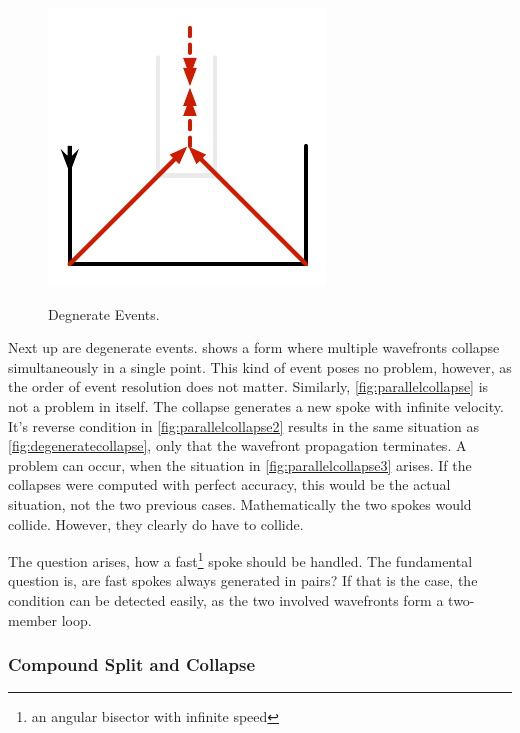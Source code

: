 \documentclass[12pt,a4paper,oneside,openany]{article}
\begin{document}
\begin{figure}[htpb]
\begin{center}
{		\includegraphics[scale=0.6667]{fig-parallel-collapse3.pdf}
		\label{fig:parallelcollapse3}}
\caption{Degnerate Events.}
\label{fig:degenerateevents}
\end{center}
\end{figure}


Next up are degenerate events.  shows a form where multiple wavefronts collapse simultaneously in a single point. This kind of event poses no problem, however, as the order of event resolution does not matter. Similarly, \cref{fig:parallelcollapse} is not a problem in itself. The collapse generates a new spoke with infinite velocity. It's reverse condition in  \cref{fig:parallelcollapse2} results in the same situation as \cref{fig:degeneratecollapse}, only that the wavefront propagation terminates. A problem can occur, when the situation in \cref{fig:parallelcollapse3} arises. If the collapses were computed with perfect accuracy, this would be the actual situation, not the two previous cases. Mathematically the two spokes would collide. However, they clearly do have to collide.

The question arises, how a fast\footnote{an angular bisector with infinite speed} spoke should be handled. The fundamental question is, are fast spokes always generated in pairs? If that is the case, the condition can be detected easily, as the two involved wavefronts form a two-member loop.

\subsubsection{Compound Split and Collapse}

\label{sec:compoundsplit}
\end{document}
